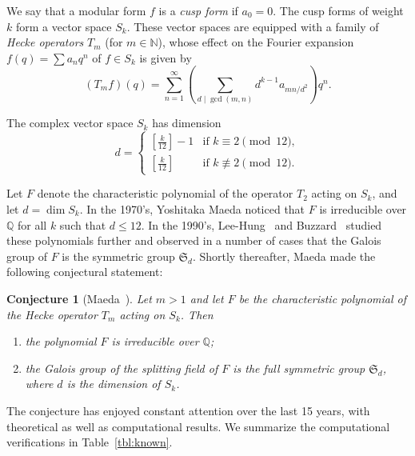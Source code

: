 \documentclass[11pt]{article}
\theoremstyle{plain}
\newtheorem{conjecture}[theorem]{Conjecture}
\theoremstyle{definition}
\theoremstyle{remark}
\numberwithin{equation}{section}
\newcommand{\QQ}{\mathbb{Q}}
\newcommand{\NN}{\mathbb{N}}
\renewcommand{\SS}{\mathfrak{S}}
\begin{document}
We say that a modular form $f$ is a \emph{cusp form} if $a_0=0$.  The cusp
forms of weight $k$ form a vector space $S_k$.  These vector spaces are
equipped with a family of \emph{Hecke operators} $T_m$ (for $m\in\NN$), whose
effect on the Fourier expansion $f(q)=\sum a_nq^n$ of $f\in S_k$ is given by
\begin{equation*}
  (T_m f)(q)=\sum_{n=1}^\infty \left(\sum_{d\mid\gcd(m,n)}d^{k-1}a_{mn/d^2}\right)q^n.
\end{equation*}

The complex vector space $S_k$ has dimension 
\begin{equation*}
  d=\begin{cases}
    \left[\frac{k}{12}\right]-1 & \text{if }k\equiv 2\pmod{12},\\
    \left[\frac{k}{12}\right] & \text{if }k\not\equiv 2\pmod{12}.
  \end{cases}
\end{equation*}

Let $F$ denote the characteristic polynomial of the operator $T_2$ acting on
$S_k$, and let $d=\dim S_k$.
In the 1970's, Yoshitaka Maeda noticed that $F$ is irreducible over $\QQ$ for
all $k$ such that $d\leq 12$.  In the 1990's, Lee-Hung~\cite{LeeHung} and
Buzzard~\cite{Buzzard} studied these polynomials further and observed in a
number of cases that the Galois group of $F$ is the symmetric group
$\SS_d$.  Shortly thereafter, Maeda made the following conjectural statement:

\begin{conjecture}[Maeda~\cite{HidaMaeda}]
  Let $m>1$ and 
  let $F$ be the characteristic polynomial of the Hecke operator $T_m$ acting
  on $S_k$.  Then 
  \begin{enumerate}
    \item the polynomial $F$ is irreducible over $\QQ$;
    \item the Galois group of the splitting field of $F$ is the full symmetric
      group $\SS_d$, where $d$ is the dimension of $S_k$.
  \end{enumerate}
\end{conjecture}

The conjecture has enjoyed constant attention over the last 15 years, with
theoretical as well as computational results.  We summarize the computational
verifications in Table~\ref{tbl:known}.
\end{document}
